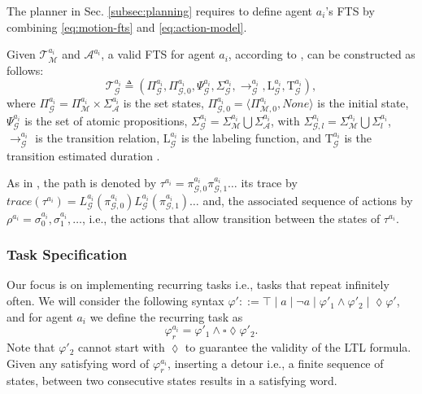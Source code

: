 The planner in Sec. \ref{subsec:planning} requires to define agent $a_i$'s FTS by combining \eqref{eq:motion-fts} and \eqref{eq:action-model}.
\begin{definition}
 Given $\mathcal{T}^{a_i}_{\mathcal{M}}$ and $\mathscr{A}^{a_i}$, a valid FTS for agent $a_i$, according to \cite{model-checking}, can be constructed as follows:
    \begin{equation}\label{eq:agent-model}    \mathcal{T}^{a_i}_{\mathcal{G}}\triangleq\left(\Pi^{a_i}_{\mathcal{G}}, \Pi^{a_i}_{\mathcal{G},0}, \Psi^{a_i}_{\mathcal{G}}, \Sigma^{a_i}_{\mathcal{G}}, \longrightarrow^{a_i}_{\mathcal{G}}, \mathrm{L}^{a_i}_{\mathcal{G}}, \mathrm{T}^{a_i}_{\mathcal{G}}\right), 
    \end{equation}
where $\Pi^{a_i}_{\mathcal{G}} = \Pi^{a_i}_{\mathcal{M}}\times \Sigma^{a_i}_{\mathscr{A}}$ is the set states,
$\Pi^{a_i}_{\mathcal{G},0}=\langle\Pi^{a_i}_{\mathcal{M},0} , \mathit{None}\rangle$ is the initial state,
$\Psi^{a_i}_{\mathcal{G}}$ is the set of atomic propositions,
$\Sigma^{a_i}_{\mathcal{G}}=\Sigma^{a_i}_{\mathcal{M}}\bigcup\Sigma^{a_i}_{\mathscr{A}}$, with $\Sigma^{a_i}_{\mathcal{G}, l}=\Sigma^{a_i}_{\mathcal{M}}\bigcup\Sigma^{a_i}_l$, 
$\longrightarrow^{a_i}_{\mathcal{G}}$ is the transition relation,
$\mathrm{L}^{a_i}_{\mathcal{G}}$ is the labeling function, and 
$\mathrm{T}^{a_i}_{\mathcal{G}}$ is the transition estimated duration \cite{meng_paper}.
\end{definition}
As in \cite{meng_paper},  the path is denoted by  $\tau^{a_{i}}=\pi^{a_i}_{\mathcal{G}, 0} \pi^{a_i}_{\mathcal{G}, 1} \ldots$ its trace by $\mathit{trace}(\tau^{a_{i}})=L_{\mathcal{G}}^{a_{i}}(\pi^{a_i}_{\mathcal{G}, 0}) L_{\mathcal{G}}^{a_{i}}(\pi^{a_i}_{\mathcal{G}, 1}) \ldots$ and, the associated sequence of actions by $\rho^{a_i}=\sigma^{a_i}_0, \sigma^{a_i}_1,\ldots$, i.e., the actions that allow transition between the states of $\tau^{a_{i}}$. 

\subsubsection{Task Specification}\label{subsec:task}
Our focus is on implementing recurring tasks i.e., tasks that repeat infinitely often. We will consider the following syntax $\varphi' ::=\top \mid a \mid \neg a\mid \varphi'_1\wedge\varphi'_2 \mid \lozenge\varphi'$, and for agent $a_i$ we define the recurring task as
\begin{equation}\label{eq:recurringLTL}
\varphi^{a_i}_r=\varphi'_1\wedge\square\lozenge\varphi'_2.
\end{equation}
Note that $\varphi'_2$ cannot start with $\lozenge$ to guarantee the validity of the LTL formula.
Given any satisfying word of $\varphi^{a_i}_r$, inserting a detour i.e., a finite sequence of states, between two consecutive states results in a satisfying word.

